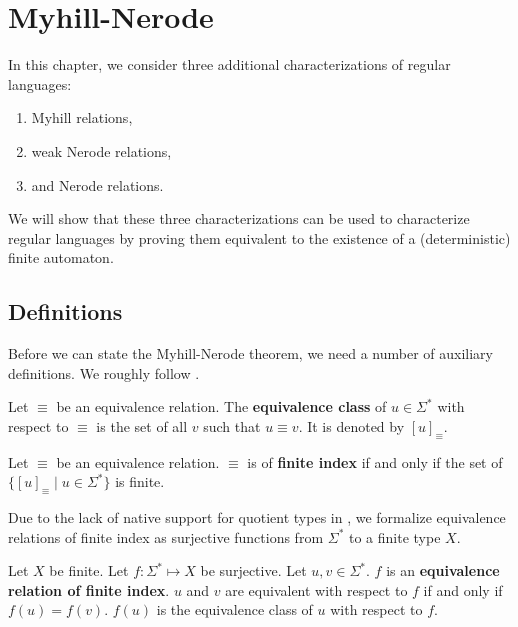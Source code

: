 
\chapter{Myhill-Nerode}
\label{chap:MN}

In this chapter, we consider three additional characterizations of regular languages:

\begin{enumerate}
    \item Myhill relations,
    \item weak Nerode relations,
    \item and Nerode relations.
\end{enumerate}


We will show that these three characterizations can be used to characterize regular languages 
by proving them equivalent to the existence of a (deterministic) finite automaton.


\section{Definitions}
Before we can state the Myhill-Nerode theorem, we need a number of auxiliary definitions. We roughly follow \cite{DBLP:books/daglib/0088160}.
\begin{definition}
    Let $\equiv$ be an equivalence relation.
    The \textbf{equivalence class} of $u \in \Sigma^*$ with respect to $\equiv$ is the set of all $v$ such that $u \equiv v$.
    It is denoted by $[u]_\equiv$.
\end{definition}

\begin{definition}
    Let $\equiv$ be an equivalence relation.
    $\equiv$ is of \textbf{finite index} if and only if the set of $\{[u]_\equiv \; | \; u \in \Sigma^* \}$ is finite.
\end{definition}


Due to the lack of native support for quotient types in \coq, 
we formalize equivalence relations of finite index 
as surjective functions from $\Sigma^*$ to a finite type $X$.

\begin{definition}
    Let $X$ be finite.
    Let $f: \Sigma^* \mapsto X$ be surjective.
    Let $u, v \in \Sigma^*$.
    $f$ is an \textbf{equivalence relation of finite index}. 
    $u$ and $v$ are equivalent with respect to $f$ if and only if $f(u) = f(v)$.
    $f(u)$ is the equivalence class of $u$ with respect to $f$.
\end{definition}

